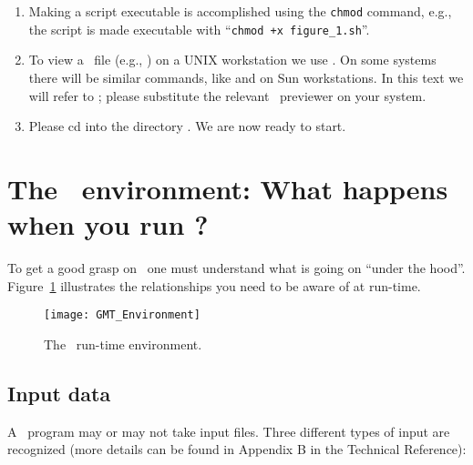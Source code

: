 \documentclass{report}
\begin{document}
\begin{enumerate}
\item Making a script executable is accomplished using the \texttt{chmod}
command, e.g., the script  is made executable
with ``\texttt{chmod +x figure\_1.sh}''.

\item To view a \PS\ file (e.g., ) on a UNIX workstation
we use  .  On some systems there
will be similar commands, like  and 
on Sun workstations.  In this text we will refer to
; please substitute the relevant \PS\ previewer
on your system.

\item Please cd into the directory .  We are
now ready to start.

\end{enumerate}

\section{The \gmt\ environment: What happens when you run \gmt ?}

To get a good grasp on \GMT\ one must understand what is going on ``under
the hood''.  Figure~\ref{fig:GMT_Environment} illustrates the relationships
you need to be aware of at run-time.

\begin{figure}[h]
   \centering\texttt{[image: GMT\_Environment]}
   \caption{The \gmt\ run-time environment.}
   \label{fig:GMT_Environment}
\end{figure}

\subsection{Input data}
A \GMT\ program may or may not take input files.  Three different
types of input are recognized (more details can be found in Appendix
B in the Technical Reference):
\end{document}
